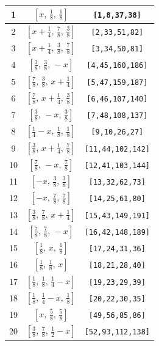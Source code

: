 \documentclass[fleqn,8pt]{jsarticle}
\begin{document}
\begin{longtable}{ccc}
1 & $\left[ x,\, \frac{1}{8},\, \frac{1}{8} \right]$ & {\tt [1,8,37,38]} \\ \hline
2 & $\left[ x + \frac{1}{4},\, \frac{7}{8},\, \frac{3}{8} \right]$ & {\tt [2,33,51,82]} \\ \hline
3 & $\left[ x + \frac{1}{4},\, \frac{3}{8},\, \frac{7}{8} \right]$ & {\tt [3,34,50,81]} \\ \hline
4 & $\left[ \frac{3}{8},\, \frac{3}{8},\, - x \right]$ & {\tt [4,45,160,186]} \\ \hline
5 & $\left[ \frac{7}{8},\, \frac{3}{8},\, x + \frac{1}{4} \right]$ & {\tt [5,47,159,187]} \\ \hline
6 & $\left[ \frac{7}{8},\, x + \frac{1}{4},\, \frac{3}{8} \right]$ & {\tt [6,46,107,140]} \\ \hline
7 & $\left[ \frac{3}{8},\, - x,\, \frac{3}{8} \right]$ & {\tt [7,48,108,137]} \\ \hline
8 & $\left[ \frac{1}{4} - x,\, \frac{1}{8},\, \frac{1}{8} \right]$ & {\tt [9,10,26,27]} \\ \hline
9 & $\left[ \frac{3}{8},\, x + \frac{1}{4},\, \frac{7}{8} \right]$ & {\tt [11,44,102,142]} \\ \hline
10 & $\left[ \frac{7}{8},\, - x,\, \frac{7}{8} \right]$ & {\tt [12,41,103,144]} \\ \hline
11 & $\left[ - x,\, \frac{3}{8},\, \frac{3}{8} \right]$ & {\tt [13,32,62,73]} \\ \hline
12 & $\left[ - x,\, \frac{7}{8},\, \frac{7}{8} \right]$ & {\tt [14,25,61,80]} \\ \hline
13 & $\left[ \frac{3}{8},\, \frac{7}{8},\, x + \frac{1}{4} \right]$ & {\tt [15,43,149,191]} \\ \hline
14 & $\left[ \frac{7}{8},\, \frac{7}{8},\, - x \right]$ & {\tt [16,42,148,189]} \\ \hline
15 & $\left[ \frac{1}{8},\, x,\, \frac{1}{8} \right]$ & {\tt [17,24,31,36]} \\ \hline
16 & $\left[ \frac{1}{8},\, \frac{1}{8},\, x \right]$ & {\tt [18,21,28,40]} \\ \hline
17 & $\left[ \frac{1}{8},\, \frac{1}{8},\, \frac{1}{4} - x \right]$ & {\tt [19,23,29,39]} \\ \hline
18 & $\left[ \frac{1}{8},\, \frac{1}{4} - x,\, \frac{1}{8} \right]$ & {\tt [20,22,30,35]} \\ \hline
19 & $\left[ x,\, \frac{5}{8},\, \frac{5}{8} \right]$ & {\tt [49,56,85,86]} \\ \hline
20 & $\left[ \frac{3}{8},\, \frac{7}{8},\, \frac{1}{2} - x \right]$ & {\tt [52,93,112,138]} \\ \hline

\end{longtable}
\end{document}
